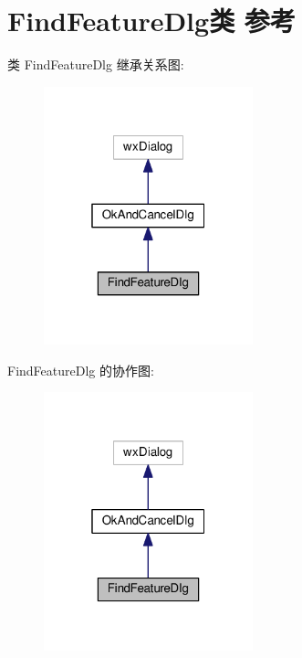 \hypertarget{class_find_feature_dlg}{\section{Find\+Feature\+Dlg类 参考}
\label{class_find_feature_dlg}
}


类 Find\+Feature\+Dlg 继承关系图\+:
\nopagebreak
\begin{figure}[H]
\begin{center}
\leavevmode
\includegraphics[width=172pt]{class_find_feature_dlg__inherit__graph}
\end{center}
\end{figure}


Find\+Feature\+Dlg 的协作图\+:
\nopagebreak
\begin{figure}[H]
\begin{center}
\leavevmode
\includegraphics[width=172pt]{class_find_feature_dlg__coll__graph}
\end{center}
\end{figure}
